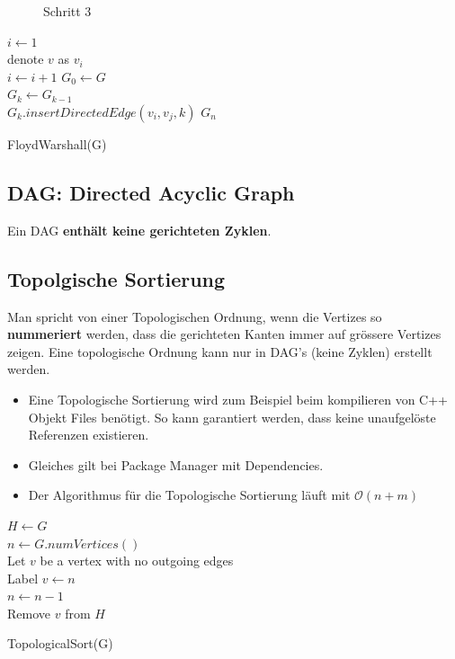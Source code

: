 \begin{figure}[ht!]
\begin{minipage}[t]{0.4\textwidth}
		\caption{Schritt 3}
		\label{fig:floyd-warshalv3}
		\end{minipage}
\end{figure}

\begin{algorithm}[H]
	$i \leftarrow 1$ \\
	{
		denote $v$ as $v_i$ \\
		$i \leftarrow i + 1$
	}
	$G_0 \leftarrow G$ \\
	{
		$G_k \leftarrow G_{k-1}$ \\
		{
			{
				{
					{
						$G_k.insertDirectedEdge(v_i, v_j, k)$
					}
				}
			}
		}
	}	
	\Return $G_n$
	\caption{FloydWarshall(G)}
\end{algorithm}

\clearpage


\subsection{DAG: Directed Acyclic Graph}
Ein DAG \textbf{enthält keine gerichteten Zyklen}.

\subsection{Topolgische Sortierung}
Man spricht von einer Topologischen Ordnung, wenn die Vertizes so \textbf{nummeriert} werden, dass die gerichteten Kanten immer auf grössere Vertizes zeigen. Eine topologische Ordnung kann nur in DAG's (keine Zyklen) erstellt werden.  
\begin{itemize}
	\item Eine Topologische Sortierung wird zum Beispiel beim kompilieren von C++ Objekt Files benötigt. So kann garantiert werden, dass keine unaufgelöste Referenzen existieren.
	\item Gleiches gilt bei Package Manager mit Dependencies.
	\item Der Algorithmus für die Topologische Sortierung läuft mit $\mathcal{O}(n+m)$
\end{itemize}

\begin{algorithm}[H]
	$H \leftarrow G$ \\
	$n \leftarrow G.numVertices()$ \\
	{
		Let $v$ be a vertex with no outgoing edges \\
		Label $v \leftarrow n$ \\
		$n \leftarrow n -1  $ \\
		Remove $v$ from $H$
	}
	\caption{TopologicalSort(G)}
\end{algorithm}


